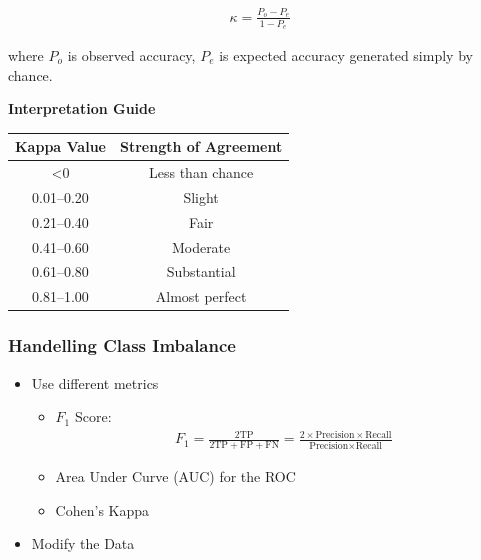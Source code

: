 \indent 

\begin{align*}
    \kappa = \frac{P_o - P_e}{1-P_e}
\end{align*}

where $P_o$ is observed accuracy, $P_e$ is expected accuracy generated simply by chance.

\bigskip

\noindent\textbf{Interpretation Guide}

\begin{table}[h]
\centering
\begin{tabular}{|c|c|}
\hline
\textbf{Kappa Value} & \textbf{Strength of Agreement} \\ \hline
\textless 0          & Less than chance               \\ \hline
0.01–0.20            & Slight                         \\ \hline
0.21–0.40            & Fair                           \\ \hline
0.41–0.60            & Moderate                       \\ \hline
0.61–0.80            & Substantial                    \\ \hline
0.81–1.00            & Almost perfect                 \\ \hline
\end{tabular}
\end{table}

\subsubsection{Handelling Class Imbalance}

\indent 

\begin{itemize}
    \item Use different metrics
        \begin{itemize}
            \item $F_1$ Score:
            \begin{align*}
                F_1 = \frac{2\text{TP}}{2\text{TP}+\text{FP}+\text{FN}} = \frac{2\times \text{Precision}\times \text{Recall}}{\text{Precision}\times \text{Recall}}
            \end{align*}
            \item Area Under Curve (AUC) for the ROC
            \item Cohen’s Kappa
    \end{itemize}
    \item Modify the Data
\end{itemize}

